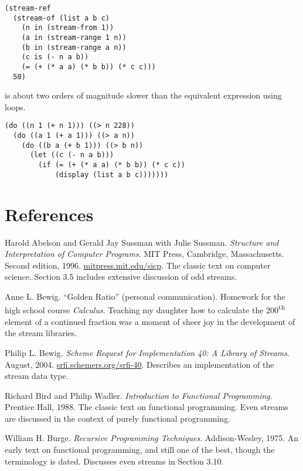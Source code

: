 \begin{verbatim}
(stream-ref
  (stream-of (list a b c)
    (n in (stream-from 1))
    (a in (stream-range 1 n))
    (b in (stream-range a n))
    (c is (- n a b))
    (= (+ (* a a) (* b b)) (* c c)))
  50)
\end{verbatim}

is about two orders of magnitude slower than the equivalent expression
using loops. 

\begin{verbatim}
(do ((n 1 (+ n 1))) ((> n 228))
  (do ((a 1 (+ a 1))) ((> a n))
    (do ((b a (+ b 1))) ((> b n))
      (let ((c (- n a b)))
        (if (= (+ (* a a) (* b b)) (* c c))
            (display (list a b c)))))))
\end{verbatim}



\section{References}\label{references}

Harold Abelson and Gerald Jay Sussman with Julie Sussman.
\emph{Structure and Interpretation of Computer Programs}. MIT Press,
Cambridge, Massachusetts. Second edition, 1996.
\href{http://mitpress.mit.edu/sicp}{mitpress.mit.edu/sicp}. The classic
text on computer science. Section 3.5 includes extensive discussion of
odd streams.

Anne L. Bewig. ``Golden Ratio'' (personal communication). Homework for
the high school course \emph{Calculus}. Teaching my daughter how to
calculate the 200\textsuperscript{th} element of a continued fraction
was a moment of sheer joy in the development of the stream libraries.

Philip L. Bewig. \emph{Scheme Request for Implementation 40: A Library
of Streams}. August, 2004.
\href{http://srfi.schemers.org/srfi-40}{srfi.schemers.org/srfi-40}.
Describes an implementation of the stream data type.

Richard Bird and Philip Wadler. \emph{Introduction to Functional
Programming}. Prentice Hall, 1988. The classic text on functional
programming. Even streams are discussed in the context of purely
functional programming.

William H. Burge. \emph{Recursive Programming Techniques}.
Addison-Wesley, 1975. An early text on functional programming, and still
one of the best, though the terminology is dated. Discusses even streams
in Section 3.10.

